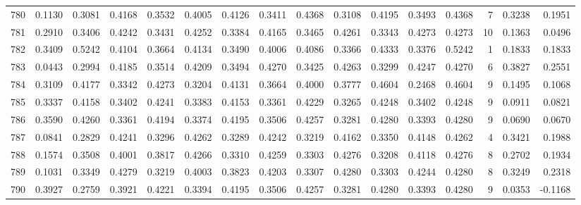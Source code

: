 \begin{tabular}{lrrrrrrrrrrrrrrr}
780 &      0.1130 &  0.3081 &  0.4168 &  0.3532 &  0.4005 &  0.4126 &  0.3411 &  0.4368 &  0.3108 &  0.4195 &   0.3493 &     0.4368 &      7 &                    0.3238 &                     0.1951 \\
781 &      0.2910 &  0.3406 &  0.4242 &  0.3431 &  0.4252 &  0.3384 &  0.4165 &  0.3465 &  0.4261 &  0.3343 &   0.4273 &     0.4273 &     10 &                    0.1363 &                     0.0496 \\
782 &      0.3409 &  0.5242 &  0.4104 &  0.3664 &  0.4134 &  0.3490 &  0.4006 &  0.4086 &  0.3366 &  0.4333 &   0.3376 &     0.5242 &      1 &                    0.1833 &                     0.1833 \\
783 &      0.0443 &  0.2994 &  0.4185 &  0.3514 &  0.4209 &  0.3494 &  0.4270 &  0.3425 &  0.4263 &  0.3299 &   0.4247 &     0.4270 &      6 &                    0.3827 &                     0.2551 \\
784 &      0.3109 &  0.4177 &  0.3342 &  0.4273 &  0.3204 &  0.4131 &  0.3664 &  0.4000 &  0.3777 &  0.4604 &   0.2468 &     0.4604 &      9 &                    0.1495 &                     0.1068 \\
785 &      0.3337 &  0.4158 &  0.3402 &  0.4241 &  0.3383 &  0.4153 &  0.3361 &  0.4229 &  0.3265 &  0.4248 &   0.3402 &     0.4248 &      9 &                    0.0911 &                     0.0821 \\
786 &      0.3590 &  0.4260 &  0.3361 &  0.4194 &  0.3374 &  0.4195 &  0.3506 &  0.4257 &  0.3281 &  0.4280 &   0.3393 &     0.4280 &      9 &                    0.0690 &                     0.0670 \\
787 &      0.0841 &  0.2829 &  0.4241 &  0.3296 &  0.4262 &  0.3289 &  0.4242 &  0.3219 &  0.4162 &  0.3350 &   0.4148 &     0.4262 &      4 &                    0.3421 &                     0.1988 \\
788 &      0.1574 &  0.3508 &  0.4001 &  0.3817 &  0.4266 &  0.3310 &  0.4259 &  0.3303 &  0.4276 &  0.3208 &   0.4118 &     0.4276 &      8 &                    0.2702 &                     0.1934 \\
789 &      0.1031 &  0.3349 &  0.4279 &  0.3219 &  0.4003 &  0.3823 &  0.4203 &  0.3307 &  0.4280 &  0.3303 &   0.4244 &     0.4280 &      8 &                    0.3249 &                     0.2318 \\
790 &      0.3927 &  0.2759 &  0.3921 &  0.4221 &  0.3394 &  0.4195 &  0.3506 &  0.4257 &  0.3281 &  0.4280 &   0.3393 &     0.4280 &      9 &                    0.0353 &                    -0.1168 \\

\end{tabular}

